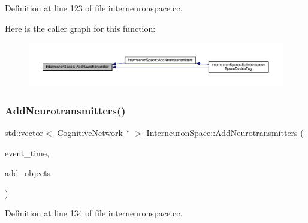 Definition at line 123 of file interneuronspace.\+cc.

Here is the caller graph for this function\+:\nopagebreak
\begin{figure}[H]
\begin{center}
\leavevmode
\includegraphics[width=350pt]{class_interneuron_space_afee7374310b2a8c08bac232d62ea7aa1_icgraph}
\end{center}
\end{figure}
\mbox{\label{class_interneuron_space_a1049397cd511c753d8c178db8f68a1a7}} 
\subsubsection{\texorpdfstring{Add\+Neurotransmitters()}{AddNeurotransmitters()}}
{\footnotesize\ttfamily std\+::vector$<$ \hyperlink{class_cognitive_network}{Cognitive\+Network} $\ast$ $>$ Interneuron\+Space\+::\+Add\+Neurotransmitters (\begin{DoxyParamCaption}\item[{std\+::chrono\+::time\+\_\+point$<$ \hyperlink{universe_8h_a0ef8d951d1ca5ab3cfaf7ab4c7a6fd80}{Clock} $>$}]{event\+\_\+time,  }\item[{std\+::vector$<$ \hyperlink{class_cognitive_network}{Cognitive\+Network} $\ast$$>$}]{add\+\_\+objects }\end{DoxyParamCaption})}



Definition at line 134 of file interneuronspace.\+cc.

